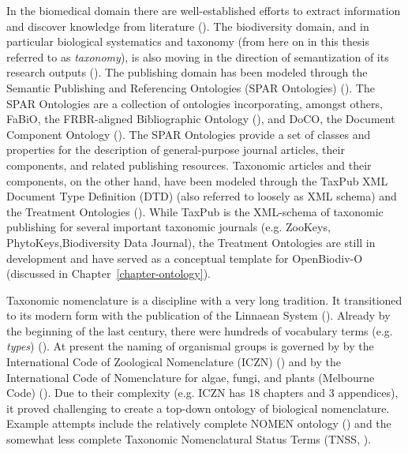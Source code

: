 In the biomedical domain there are well-established efforts to extract information and discover knowledge from literature (\cite{momtchev_expanding_2009, williams_open_2012, rebholz-schuhmann_facts_2005}).  The biodiversity domain, and in particular biological systematics and taxonomy (from here on in this thesis referred to as \emph{taxonomy}), is also moving in the direction of semantization of its research outputs (\cite{kennedy_scientific_2005,penev_fast_2010, tzitzikas_integrating_2013}).  The publishing domain has been modeled through the Semantic Publishing and Referencing Ontologies (SPAR Ontologies) (\cite{peroni_semantic_2014}).   The SPAR Ontologies are a collection of ontologies incorporating, amongst others, FaBiO, the FRBR-aligned Bibliographic Ontology (\cite{peroni_fabio_2012}), and DoCO, the Document Component Ontology (\cite{constantin_document_2016}).   The SPAR Ontologies provide a set of classes and properties for the description of general-purpose journal articles, their components, and related publishing resources.  Taxonomic articles and their components, on the other hand, have been modeled through the TaxPub XML Document Type Definition (DTD) (also referred to loosely as XML schema) and the Treatment Ontologies (\cite{catapano_taxpub:_2010}).  While TaxPub is the XML-schema of taxonomic publishing for several important taxonomic journals (e.g. ZooKeys, PhytoKeys,Biodiversity Data Journal), the Treatment Ontologies are still in development and have served as a conceptual template for OpenBiodiv-O (discussed in Chapter~\ref{chapter-ontology}). 

Taxonomic nomenclature is a discipline with a very long tradition.  It transitioned to its modern form with the publication of the Linnaean System (\cite{linnaeus_systema_1758}).  Already by the beginning of the last century, there were hundreds of vocabulary terms (e.g. \emph{types}) (\cite{witteveen_naming_2015}).  At present the naming of organismal groups is governed by by the International Code of Zoological Nomenclature (ICZN) (\cite{international_commission_on_zoological_nomenclature_international_1999}) and by the International Code of Nomenclature for algae, fungi, and plants (Melbourne Code) (\cite{mcneill_international_2012}).  Due to their complexity (e.g. ICZN has 18 chapters and 3 appendices), it proved challenging to create a top-down ontology of biological nomenclature. Example attempts include the relatively complete NOMEN ontology (\cite{dmitriev_nomen_2017}) and the somewhat less complete Taxonomic Nomenclatural Status Terms (TNSS, \cite{morris_taxonomic_nodate}).

